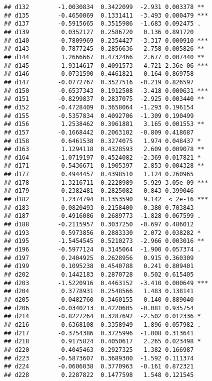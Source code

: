 \documentclass[
]{article}
\begin{document}
\begin{verbatim}
## d132        -1.0030834  0.3422099  -2.931 0.003378 ** 
## d135        -0.4650069  0.1331411  -3.493 0.000479 ***
## d137        -0.5915665  0.3515986  -1.683 0.092475 .  
## d139         0.0352127  0.2586720   0.136 0.891720    
## d140        -0.7809969  0.2354427  -3.317 0.000910 ***
## d143         0.7877245  0.2856636   2.758 0.005826 ** 
## d144         1.2666667  0.4732466   2.677 0.007440 ** 
## d145         1.9314617  0.4091573   4.721 2.36e-06 ***
## d146         0.0731590  0.4461821   0.164 0.869758    
## d147        -0.0772767  0.3527516  -0.219 0.826597    
## d150        -0.6537343  0.1912508  -3.418 0.000631 ***
## d151        -0.8299837  0.2837075  -2.925 0.003440 ** 
## d152        -0.4728409  0.3658064  -1.293 0.196154    
## d155        -0.5357834  0.4092706  -1.309 0.190499    
## d156         1.2538462  0.3961881   3.165 0.001553 ** 
## d157        -0.1668442  0.2063102  -0.809 0.418687    
## d158         0.6461538  0.3274075   1.974 0.048437 *  
## d163         1.1294118  0.4328593   2.609 0.009078 ** 
## d164        -1.0719197  0.4524082  -2.369 0.017821 *  
## d171         0.5436671  0.1905397   2.853 0.004328 ** 
## d177         0.4944457  0.4398510   1.124 0.260965    
## d178         1.3216711  0.2228989   5.929 3.05e-09 ***
## d179         0.2382481  0.2825082   0.843 0.399046    
## d182         1.2374794  0.1353590   9.142  < 2e-16 ***
## d183        -0.0820493  0.2158400  -0.380 0.703843    
## d187        -0.4916086  0.2689773  -1.828 0.067599 .  
## d188        -0.2115957  0.3037250  -0.697 0.486012    
## d193         0.5973856  0.2883330   2.072 0.038282 *  
## d195        -1.5454545  0.5210273  -2.966 0.003016 ** 
## d196        -0.5977124  0.3145064  -1.900 0.057374 .  
## d197         0.2404925  0.2628956   0.915 0.360309    
## d199         0.1095238  0.4540788   0.241 0.809401    
## d202         0.1442183  0.2870728   0.502 0.615405    
## d203        -1.5220916  0.4463152  -3.410 0.000649 ***
## d204         0.3778931  0.2548566   1.483 0.138141    
## d205         0.0482760  0.3460155   0.140 0.889040    
## d206        -0.0340213  0.4220605  -0.081 0.935754    
## d214        -0.8227264  0.3287692  -2.502 0.012336 *  
## d216         0.6368108  0.3358949   1.896 0.057982 .  
## d217        -0.3754386  0.3725996  -1.008 0.313641    
## d218         0.9175824  0.4050617   2.265 0.023498 *  
## d220         0.4045463  0.2927325   1.382 0.166987    
## d223        -0.5873607  0.3689300  -1.592 0.111374    
## d224        -0.0606038  0.3770963  -0.161 0.872321    
## d228         0.2287822  0.1477598   1.548 0.121545    

\end{verbatim}
\end{document}
